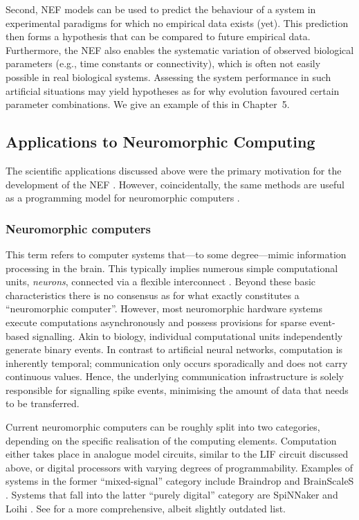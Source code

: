 Second, NEF models can be used to predict the behaviour of a system in experimental paradigms for which no empirical data exists (yet).
This prediction then forms a hypothesis that can be compared to future empirical data.
Furthermore, the NEF also enables the systematic variation of observed biological parameters (e.g., time constants or connectivity), which is often not easily possible in real biological systems.
Assessing the system performance in such artificial situations may yield hypotheses as for why evolution favoured certain parameter combinations.
We give an example of this in Chapter~5.

\subsection{Applications to Neuromorphic Computing}

The scientific applications discussed above were the primary motivation for the development of the NEF \citep[Chapter~1]{eliasmith2003neural}.
However, coincidentally, the same methods are useful as a programming model for neuromorphic computers \citep{boahen2017neuromorph}.

\subsubsection{Neuromorphic computers}
This term refers to computer systems that---to some degree---mimic information processing in the brain.
This typically implies numerous simple computational units, \emph{neurons}, connected via a flexible interconnect \citep{furber2016largescale}.
Beyond these basic characteristics there is no consensus as for what exactly constitutes a \enquote{neuromorphic computer}.
However, most neuromorphic hardware systems execute computations asynchronously and possess provisions for sparse event-based signalling.
Akin to biology, individual computational units independently generate binary events.
In contrast to artificial neural networks, computation is inherently temporal; communication only occurs sporadically and does not carry continuous values.
Hence, the underlying communication infrastructure is solely responsible for signalling spike events, minimising the amount of data that needs to be transferred.

Current neuromorphic computers can be roughly split into two categories, depending on the specific realisation of the computing elements.
Computation either takes place in analogue model circuits, similar to the LIF circuit discussed above, or digital processors with varying degrees of programmability.
Examples of systems in the former \enquote{mixed-signal} category include Braindrop \citep{neckar2019braindrop} and BrainScaleS \citep{schemmel2010waferscale}.
Systems that fall into the latter \enquote{purely digital} category are SpiNNaker \citep{furber2013overview} and Loihi \citep{davies2018loihi}. See \citet{furber2016largescale} for a more comprehensive, albeit slightly outdated list.

